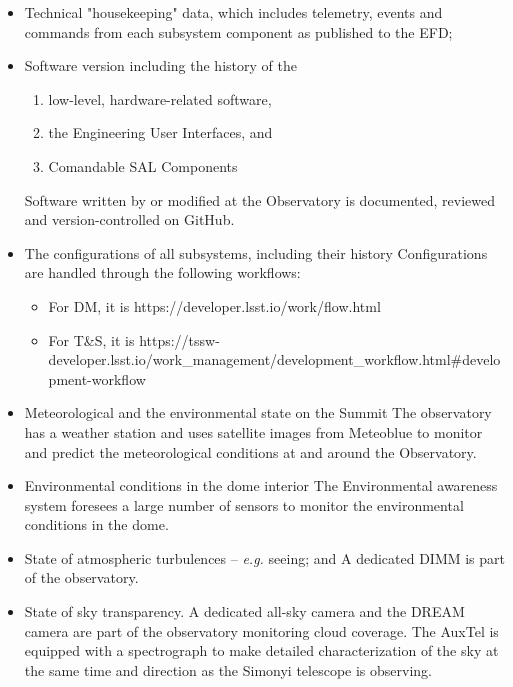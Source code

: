 \begin{itemize}
	\item Technical "housekeeping" data, which includes telemetry, events and commands from each subsystem component as published to the EFD;
	
	\item Software version including the history of the 
	\begin{enumerate}
		\item low-level, hardware-related software, 
		\item the Engineering User Interfaces, and 
		\item Comandable SAL Components 
	\end{enumerate}
	Software written by or modified at the Observatory is documented, reviewed and version-controlled on GitHub. 
	
	\item The configurations of all subsystems, including their history
	Configurations are handled through the following workflows:
	\begin{itemize}
		\item For DM, it is https://developer.lsst.io/work/flow.html
		\item For T\&S, it is https://tssw-developer.lsst.io/work_management/development_workflow.html#development-workflow
	\end{itemize}

	\item Meteorological and the environmental state on the Summit
	The observatory has a weather station and uses satellite images from Meteoblue to monitor and predict the meteorological conditions at and around the Observatory.
	
	\item Environmental conditions in the dome interior
	The Environmental awareness system foresees a large number of sensors to monitor the environmental conditions in the dome.
	
	\item State of atmospheric turbulences -- {\it e.g.} seeing; and
	A dedicated DIMM is part of the observatory.
	
	\item State of sky transparency.
	A dedicated all-sky camera and the DREAM camera are part of the observatory monitoring cloud coverage. 
	The AuxTel is equipped with a spectrograph to make detailed characterization of the sky at the same time and direction as the Simonyi telescope is observing.
	
\end{itemize}

